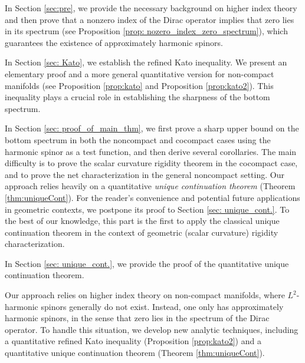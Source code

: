 \documentclass[12pt, reqno]{amsart}
\theoremstyle{plain}%
\theoremstyle{definition}
\theoremstyle{remark}
\numberwithin{equation}{section}
\begin{document}
In Section \ref{sec:pre}, we provide the necessary background on higher index theory and then prove that a nonzero index of the Dirac operator implies that zero lies in its spectrum (see Proposition \ref{prop: nozero_index_zero_spectrum}), which guarantees the existence of approximately harmonic spinors.


In Section \ref{sec: Kato}, we establish the refined Kato inequality. We present an elementary proof and a more general quantitative version for non-compact manifolds (see Proposition \ref{prop:kato} and Proposition \ref{prop:kato2}). This inequality plays a crucial role in establishing the sharpness of the bottom spectrum.

In Section \ref{sec: proof_of_main_thm}, we first prove a sharp upper bound on the bottom spectrum in both the noncompact and cocompact cases using the harmonic spinor as a test function, and then derive several corollaries. The main difficulty is to prove the scalar curvature rigidity theorem in the cocompact case, and to prove the net characterization in the general noncompact setting. Our approach relies heavily on a quantitative \emph{unique continuation theorem} (Theorem \ref{thm:uniqueCont}). For the reader’s convenience and potential future applications in geometric contexts, we postpone its proof to Section \ref{sec: unique_cont.}. To the best of our knowledge, this part is the first to apply the classical unique continuation theorem in the context of geometric (scalar curvature) rigidity characterization.


In Section \ref{sec: unique_cont.}, we provide the proof of the quantitative unique continuation theorem.

Our approach relies on higher index theory on non-compact manifolds, where $L^2$-harmonic spinors generally do not exist. Instead, one only has approximately harmonic spinors, in the sense that zero lies in the spectrum of the Dirac operator. To handle this situation, we develop new analytic techniques, including a quantitative refined Kato inequality (Proposition \ref{prop:kato2}) and a quantitative unique continuation theorem (Theorem \ref{thm:uniqueCont}).
\end{document}
